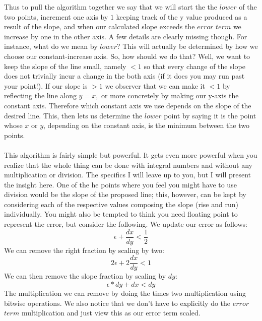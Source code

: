 \documentclass[10pt,a4paper,titlepage]{book}
\begin{document}
Thus to pull the algorithm together we say that we will start the the $lower$ of the two points, increment one axis by $1$ keeping track of the y value produced as a result of the slope, and when our calculated slope exceeds the $error$ $term$ we increase by one in the other axis. A few details are clearly missing though. For instance, what do we mean by $lower$? This will actually be determined by how we choose our constant-increase axis. So, how should we do that? Well, we want to keep the slope of the line small, namely $<1$ so that every change of the slope does not trivially incur a change in the both axis (if it does you may run past your point!). If our slope is $>1$ we observer that we can make it $<1$ by reflecting the line along $y=x,$ or more concretely by making our y-axis the constant axis. Therefore which constant axis we use depends on the slope of the desired line. This, then lets us determine the $lower$ point by saying it is the point whose $x$ or $y$, depending on the constant axis, is the minimum between the two points.\\\\
This algorithm is fairly simple but powerful. It gets even more powerful when you realize that the whole thing can be done with integral numbers and without any multiplication or division. The specifics I will leave up to you, but I will present the insight here. One of the he points where you feel you might have to use division would be the slope of the proposed line; this, however, can be kept by considering each of the respective values composing the slope (rise and run) individually. You might also be tempted to think you need floating point to represent the error, but consider the following. We update our error as follows: \[\epsilon + \frac{dx}{dy} < \frac{1}{2} \] We can remove the right fraction by scaling by two: \[2\epsilon + 2 \frac{dx}{dy} < 1\] We can then remove the slope fraction by scaling by $dy$: \[\epsilon*dy + dx < dy\]
The multiplication we can remove by doing the times two multiplication using bitwise operations. We also notice that we don't have to explicitly do the $error$ $term$ multiplication and just view this as our error term scaled. 
\end{document}
